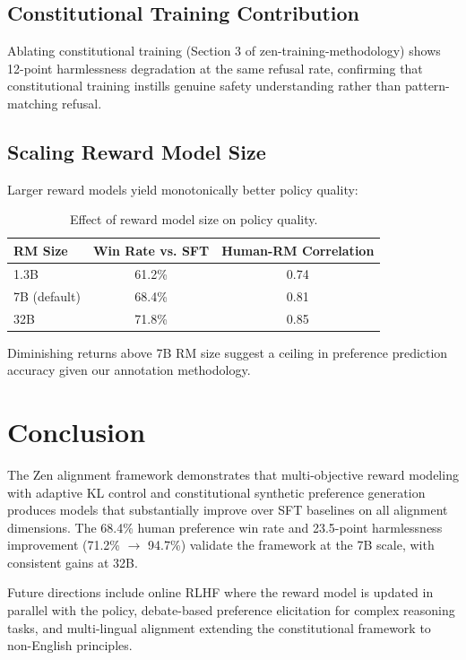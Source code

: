 \documentclass[11pt,a4paper]{article}
\begin{document}
\subsection{Constitutional Training Contribution}

Ablating constitutional training (Section 3 of zen-training-methodology) shows
12-point harmlessness degradation at the same refusal rate, confirming that
constitutional training instills genuine safety understanding rather than
pattern-matching refusal.

\subsection{Scaling Reward Model Size}

Larger reward models yield monotonically better policy quality:

\begin{table}[H]
\centering
\begin{tabular}{lcc}
\toprule
\textbf{RM Size} & \textbf{Win Rate vs. SFT} & \textbf{Human-RM Correlation} \\
\midrule
1.3B & 61.2\% & 0.74 \\
7B (default) & 68.4\% & 0.81 \\
32B & 71.8\% & 0.85 \\
\bottomrule
\end{tabular}
\caption{Effect of reward model size on policy quality.}
\end{table}

Diminishing returns above 7B RM size suggest a ceiling in preference prediction
accuracy given our annotation methodology.

\section{Conclusion}

The Zen alignment framework demonstrates that multi-objective reward modeling with
adaptive KL control and constitutional synthetic preference generation produces
models that substantially improve over SFT baselines on all alignment dimensions.
The 68.4\% human preference win rate and 23.5-point harmlessness improvement
(71.2\% $\to$ 94.7\%) validate the framework at the 7B scale, with consistent
gains at 32B.

Future directions include online RLHF where the reward model is updated in parallel
with the policy, debate-based preference elicitation for complex reasoning tasks,
and multi-lingual alignment extending the constitutional framework to non-English
principles.
\end{document}
